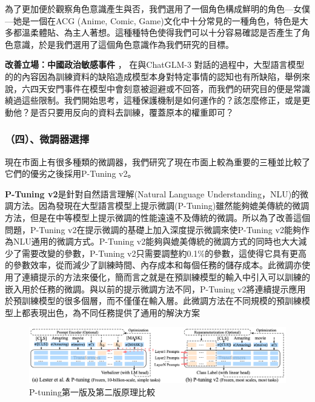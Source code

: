 \documentclass[12pt,a4paper,MingLiU,UTF8,natbib]{article}
\def\xeCJKembold{0.4}
\def\saveCJKnode{\dimen255\lastkern}
\def\restoreCJKnode{\kern-\dimen255\kern\dimen255}
\let\CJKoldsymbol\CJKsymbol
\let\CJKoldpunctsymbol\CJKpunctsymbol
\def\CJKfakeboldsymbol#1{%
	\special{pdf:literal direct 2 Tr \xeCJKembold\space w}%
	\CJKoldsymbol{#1}%
	\saveCJKnode
	\special{pdf:literal direct 0 Tr}%
	\restoreCJKnode}
\def\CJKfakeboldpunctsymbol#1{%
	\special{pdf:literal direct 2 Tr \xeCJKembold\space w}%
	\CJKoldpunctsymbol{#1}%
	\saveCJKnode
	\special{pdf:literal direct 0 Tr}%
	\restoreCJKnode}
\newcommand\CJKfakebold[1]{%
	\let\CJKsymbol\CJKfakeboldsymbol
	\let\CJKpunctsymbol\CJKfakeboldpunctsymbol
	#1%
	\let\CJKsymbol\CJKoldsymbol
	\let\CJKpunctsymbol\CJKoldpunctsymbol}
\begin{document}
為了更加便於觀察角色意識產生與否，我們選用了一個角色構成鮮明的角色—女僕—她是一個在ACG (Anime, Comic, Game)文化中十分常見的一種角色，特色是大多都溫柔體貼、為主人著想。這種種特色使得我們可以十分容易確認是否產生了角色意識，於是我們選用了這個角色意識作為我們研究的目標。

	\CJKfakebold{\textbf{改善立場：中國政治敏感事件}}，	在與ChatGLM-3 對話的過程中，大型語言模型的的內容因為訓練資料的缺陷造成模型本身對特定事情的認知也有所缺陷，舉例來說，六四天安門事件在模型中會刻意被迴避或不回答，而我們的研究目的便是常識繞過這些限制。我們開始思考，這種保護機制是如何運作的？該怎麼修正，或是更動他？是否只要用反向的資料去訓練，覆蓋原本的權重即可？


 
	\subsubsection{（四）、微調器選擇}
	現在市面上有很多種類的微調器，我們研究了現在市面上較為重要的三種並比較了它們的優劣之後採用P-Tuning v2。
	

	\textbf{P-Tuning v2}是針對自然語言理解(Natural Language Understanding，NLU)的微調方法。因為發現在大型語言模型上提示微調(P-Tuning)雖然能夠媲美傳統的微調方法，但是在中等模型上提示微調的性能遠遠不及傳統的微調。所以為了改善這個問題，P-Tuning v2在提示微調的基礎上加入深度提示微調來使P-Tuning v2能夠作為NLU通用的微調方式。P-Tuning v2能夠與媲美傳統的微調方式的同時也大大減少了需要改變的參數，P-Tuning v2只需要調整約0.1\%的參數，這使得它具有更高的參數效率，從而減少了訓練時間、內存成本和每個任務的儲存成本。\cite{liu2022ptuning}此微調亦使用了連續提示的方法來優化，簡而言之就是在預訓練模型的輸入中引入可以訓練的嵌入用於任務的微調。與以前的提示微調方法不同，P-Tuning v2將連續提示應用於預訓練模型的很多個層，而不僅僅在輸入層。此微調方法在不同規模的預訓練模型上都表現出色，為不同任務提供了通用的解決方案\cite{houlsby2019parameterefficient}

	
	\begin{figure}[H]
		\centering
	\includegraphics[width=\textwidth]{community_8263c05}
		\caption{P-tuning第一版及第二版原理比較\protect\cite{liu2022ptuning}}	
	\end{figure}
\end{document}
